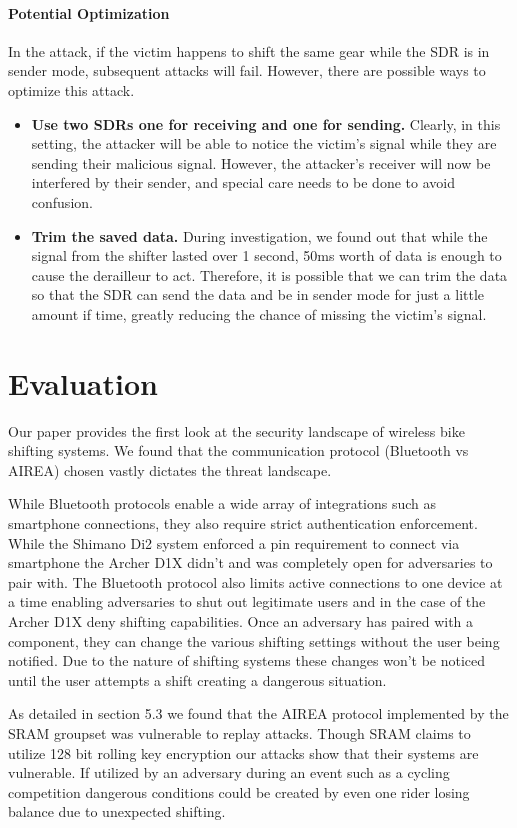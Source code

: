 \documentclass[letterpaper,twocolumn,10pt]{article}
\begin{document}
\paragraph{Potential Optimization}
In the attack, if the victim happens to shift the same gear while the SDR is in sender mode, 
subsequent attacks will fail. However, there are possible ways to optimize this attack.
\begin{itemize}
  \item \textbf{Use two SDRs one for receiving and one for sending.} Clearly, in this setting, the attacker will be able to notice the victim's signal while they are sending their malicious signal. However, the attacker's receiver will now be interfered by their sender, and special care needs to be done to avoid confusion.
  \item \textbf{Trim the saved data.} During investigation, we found out that while the signal from the shifter lasted over 1 second, 50ms worth of data is enough to cause the derailleur to act. Therefore, it is possible that we can trim the data so that the SDR can send the data and be in sender mode for just a little amount if time, greatly reducing the chance of missing the victim's signal.
\end{itemize}


\section{Evaluation}

Our paper provides the first look at the security landscape of wireless bike shifting systems. We found that the communication protocol (Bluetooth vs AIREA) chosen vastly dictates the threat landscape. 

While Bluetooth protocols enable a wide array of integrations such as smartphone connections, they also require strict authentication enforcement. While the Shimano Di2 system enforced a pin requirement to connect via smartphone the Archer D1X didn’t and was completely open for adversaries to pair with. The Bluetooth protocol also limits active connections to one device at a time enabling adversaries to shut out legitimate users and in the case of the Archer D1X deny shifting capabilities. Once an adversary has paired with a component, they can change the various shifting settings without the user being notified. Due to the nature of shifting systems these changes won’t be noticed until the user attempts a shift creating a dangerous situation.

 As detailed in section 5.3 we found that the AIREA protocol implemented by the SRAM groupset was vulnerable to replay attacks. Though SRAM claims to utilize 128 bit rolling key encryption our attacks show that their systems are vulnerable. If utilized by an adversary during an event such as a cycling competition dangerous conditions could be created by even one rider losing balance due to unexpected shifting.
\end{document}
